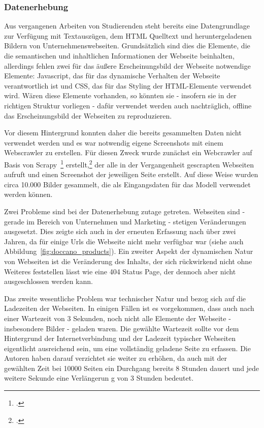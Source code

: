 \subsubsection{Datenerhebung}\label{subsubsec_class_datenerhebung}
Aus vergangenen Arbeiten von Studierenden steht bereits eine Datengrundlage zur Verfügung mit Textauszügen, dem HTML Quelltext und heruntergeladenen Bildern von Unternehmenswebseiten.
Grundsätzlich sind dies die Elemente, die die semantischen und inhaltlichen Informationen der Webseite beinhalten, allerdings fehlen zwei für das äußere Erscheinungsbild der Webseite notwendige Elemente:
Javascript, das für das dynamische Verhalten der Webseite verantwortlich ist und CSS, das für das Styling der HTML-Elemente verwendet wird.
Wären diese Elemente vorhanden, so könnten sie - insofern sie in der richtigen Struktur vorliegen - dafür verwendet werden auch nachträglich, offline das Erscheinungsbild der Webseiten zu reproduzieren.

Vor diesem Hintergrund konnten daher die bereits gesammelten Daten nicht verwendet werden und es war notwendig eigene Screenshots mit einem Webscrawler zu erstellen.
Für diesen Zweck wurde zunächst ein Webcrawler auf Basis von Scrapy~\footcite[\vglf][]{zotero-328} erstellt,\footcite[\vglf][]{ostkamp2022a} der alle in der Vergangenheit gescrapten Webseiten aufruft und einen Screenshot der jeweiligen Seite erstellt.
Auf diese Weise wurden circa 10.000 Bilder gesammelt, die als Eingangsdaten für das Modell verwendet werden können.

Zwei Probleme sind bei der Datenerhebung zutage getreten.
Webseiten sind - gerade im Bereich von Unternehmen und Marketing - stetigen Veränderungen ausgesetzt. Dies zeigte sich auch in der erneuten Erfassung nach über zwei Jahren, da für einige Urls die Webseite nicht mehr verfügbar war (siehe auch Abbildung~\ref{fig:doccano_products}).
Ein zweiter Aspekt der dynamischen Natur von Webseiten ist die Veränderung des Inhalts, der sich rückwirkend nicht ohne Weiteres feststellen lässt wie eine 404 Status Page, der dennoch aber nicht ausgeschlossen werden kann.

Das zweite wesentliche Problem war technischer Natur und bezog sich auf die Ladezeiten der Webseiten. In einigen Fällen ist es vorgekommen, dass auch nach einer Wartezeit von 3 Sekunden, noch nicht alle Elemente der Webseite - insbesondere Bilder - geladen waren.
Die gewählte Wartezeit sollte vor dem Hintergrund der Internetverbindung und der Ladezeit typischer Webseiten eigentlicht ausreichend sein, um eine vollständig geladene Seite zu erfassen.
Die Autoren haben darauf verzichtet sie weiter zu erhöhen, da auch mit der gewählten Zeit bei 10000 Seiten ein Durchgang bereits 8 Stunden dauert und jede weitere Sekunde eine Verlängerun g von 3 Stunden bedeutet.

